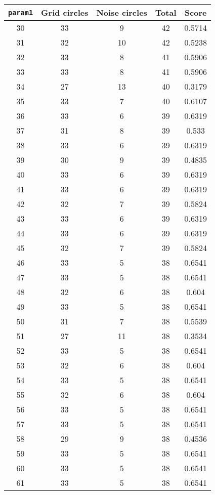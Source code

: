 \documentclass[letterpaper, 12pt]{article}
\begin{document}
\begin{longtable}{|c|c|c|c|c|}
\hline
\textbf{\texttt{param1}} & \textbf{Grid circles} & \textbf{Noise circles} & \textbf{Total} & \textbf{Score} \\
\hline
30 & 33 & 9 & 42 & 0.5714 \\
\hline
31 & 32 & 10 & 42 & 0.5238 \\
\hline
32 & 33 & 8 & 41 & 0.5906 \\
\hline
33 & 33 & 8 & 41 & 0.5906 \\
\hline
34 & 27 & 13 & 40 & 0.3179 \\
\hline
35 & 33 & 7 & 40 & 0.6107 \\
\hline
36 & 33 & 6 & 39 & 0.6319 \\
\hline
37 & 31 & 8 & 39 & 0.533 \\
\hline
38 & 33 & 6 & 39 & 0.6319 \\
\hline
39 & 30 & 9 & 39 & 0.4835 \\
\hline
40 & 33 & 6 & 39 & 0.6319 \\
\hline
41 & 33 & 6 & 39 & 0.6319 \\
\hline
42 & 32 & 7 & 39 & 0.5824 \\
\hline
43 & 33 & 6 & 39 & 0.6319 \\
\hline
44 & 33 & 6 & 39 & 0.6319 \\
\hline
45 & 32 & 7 & 39 & 0.5824 \\
\hline
46 & 33 & 5 & 38 & 0.6541 \\
\hline
47 & 33 & 5 & 38 & 0.6541 \\
\hline
48 & 32 & 6 & 38 & 0.604 \\
\hline
49 & 33 & 5 & 38 & 0.6541 \\
\hline
50 & 31 & 7 & 38 & 0.5539 \\
\hline
51 & 27 & 11 & 38 & 0.3534 \\
\hline
52 & 33 & 5 & 38 & 0.6541 \\
\hline
53 & 32 & 6 & 38 & 0.604 \\
\hline
54 & 33 & 5 & 38 & 0.6541 \\
\hline
55 & 32 & 6 & 38 & 0.604 \\
\hline
56 & 33 & 5 & 38 & 0.6541 \\
\hline
57 & 33 & 5 & 38 & 0.6541 \\
\hline
58 & 29 & 9 & 38 & 0.4536 \\
\hline
59 & 33 & 5 & 38 & 0.6541 \\
\hline
60 & 33 & 5 & 38 & 0.6541 \\
\hline
61 & 33 & 5 & 38 & 0.6541 \\

\end{longtable}
\end{document}
